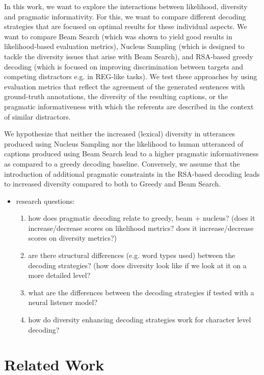 \documentclass[11pt,a4paper]{article}
\begin{document}
In this work, we want to explore the interactions between likelihood, diversity and pragmatic informativity. For this, we want to compare different decoding strategies that are focused on optimal results for these individual aspects. We want to compare Beam Search (which was shown to yield good results in likelihood-based evaluation metrics), Nucleus Sampling (which is designed to tackle the diversity issues that arise with Beam Search), and RSA-based greedy decoding (which is focused on improving discrimination between targets and competing distractors e.g. in REG-like tasks). We test these approaches by using evaluation metrics that reflect the agreement of the generated sentences with ground-truth annotations, the diversity of the resulting captions, or the pragmatic informativeness with which the referents are described in the context of similar distractors.

We hypothesize that neither the increased (lexical) diversity in utterances produced using Nucleus Sampling nor the likelihood to human utteranced of captions produced using Beam Search lead to a higher pragmatic informativeness as compared to a greedy decoding baseline. Conversely, we assume that the introduction of additional pragmatic constraints in the RSA-based decoding leads to increased diversity compared to both to Greedy and Beam Search.

\begin{itemize}

	\item research questions: 
	\begin{enumerate}
		\item how does pragmatic decoding relate to greedy, beam + nucleus? (does it increase/decrease scores on likelihood metrics? does it increase/decrease scores on diversity metrics?)
		\item are there structural differences (e.g. word types used) between the decoding strategies? (how does diversity look like if we look at it on a more detailed level?
		\item what are the differences between the decoding strategies if tested with a neural listener model?
		\item how do diversity enhancing decoding strategies work for character level decoding?
	\end{enumerate}

\end{itemize}

\section{Related Work}
\end{document}
